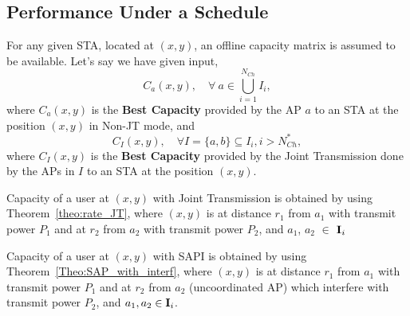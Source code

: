 \subsection{Performance Under a Schedule}
\label{subsec:system_analysis}
For any given STA, located at $(x,y)$, an offline capacity matrix is assumed to be available. Let's say we have given input,
\[C_a (x,y), \quad \forall \  a \in \bigcup\limits_{i=1}^{N_{Ch}} I_{i},\]
where $C_a(x, y)$ is the \textbf{Best Capacity} provided by the AP $a$ to an STA at the position $(x, y)$ in Non-JT mode, and
\[C_I (x,y), \quad \forall I = \{a,b\} \subseteq I_i, i > N_{Ch}^*,\]
where $C_I(x, y)$ is the \textbf{Best Capacity} provided by the Joint Transmission done by the APs in $I$ to an STA at the position $(x, y)$.

Capacity of a user at $(x,y)$ with Joint Transmission is obtained by using Theorem~\ref{theo:rate_JT}, where $(x,y)$ is at distance $r_1$ from $a_1$ with transmit power $P_1$ and at $r_2$ from $a_2$ with transmit power $P_2$, and $a_1$, $a_2$ $\in$ $\textbf{I}_i$
	

Capacity of a user at $(x,y)$ with SAPI is obtained by using Theorem~\ref{Theo:SAP_with_interf}, where $(x,y)$ is at distance $r_1$ from $a_1$ with transmit power $P_1$ and at $r_2$ from $a_2$ (uncoordinated AP) which interfere with transmit power $P_2$, and $a_1, a_2 \in \textbf{I}_i$.

